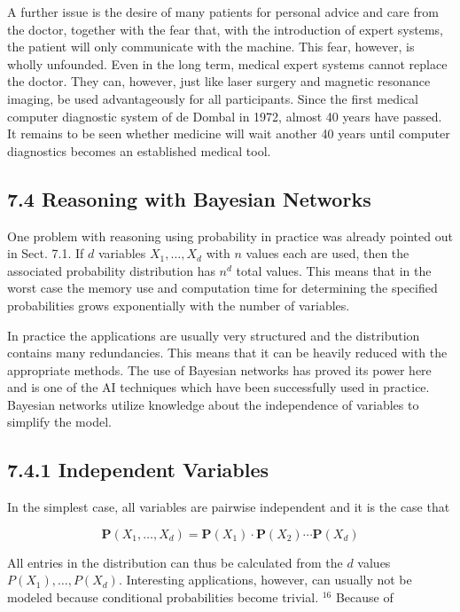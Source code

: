 \documentclass[10pt]{article}
\begin{document}
A further issue is the desire of many patients for personal advice and care from the doctor, together with the fear that, with the introduction of expert systems, the patient will only communicate with the machine. This fear, however, is wholly unfounded. Even in the long term, medical expert systems cannot replace the doctor. They can, however, just like laser surgery and magnetic resonance imaging, be used advantageously for all participants. Since the first medical computer diagnostic system of de Dombal in 1972, almost 40 years have passed. It remains to be seen whether medicine will wait another 40 years until computer diagnostics becomes an established medical tool.

\subsection*{7.4 Reasoning with Bayesian Networks}
One problem with reasoning using probability in practice was already pointed out in Sect. 7.1. If $d$ variables $X_{1}, \ldots, X_{d}$ with $n$ values each are used, then the associated probability distribution has $n^{d}$ total values. This means that in the worst case the memory use and computation time for determining the specified probabilities grows exponentially with the number of variables.

In practice the applications are usually very structured and the distribution contains many redundancies. This means that it can be heavily reduced with the appropriate methods. The use of Bayesian networks has proved its power here and is one of the AI techniques which have been successfully used in practice. Bayesian networks utilize knowledge about the independence of variables to simplify the model.

\subsection*{7.4.1 Independent Variables}
In the simplest case, all variables are pairwise independent and it is the case that

$$
\boldsymbol{P}\left(X_{1}, \ldots, X_{d}\right)=\boldsymbol{P}\left(X_{1}\right) \cdot \boldsymbol{P}\left(X_{2}\right) \cdots \boldsymbol{P}\left(X_{d}\right)
$$

All entries in the distribution can thus be calculated from the $d$ values $P\left(X_{1}\right), \ldots, P\left(X_{d}\right)$. Interesting applications, however, can usually not be modeled because conditional probabilities become trivial. ${ }^{16}$ Because of
\end{document}
